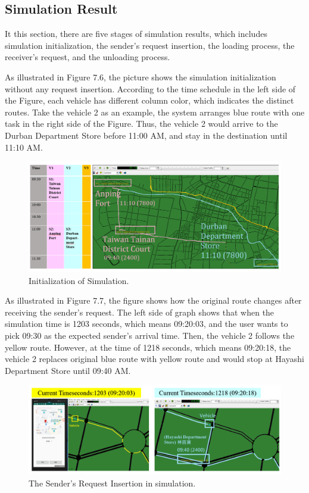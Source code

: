 \documentclass[12pt]{ksthesis}
\begin{document}
\begin{thesis}
{\section{Simulation Result}
It this section, there are five stages of simulation results, which includes simulation initialization, the sender’s request insertion, the loading process, the receiver’s request, and the unloading process.

As illustrated in Figure 7.6, the picture shows the simulation initialization without any request insertion. According to the time schedule in the left side of the Figure, each vehicle has different column color, which indicates the distinct routes. Take the vehicle 2 as an example, the system arranges blue route with one task in the right side of the Figure. Thus, the vehicle 2 would arrive to the Durban Department Store before 11:00 AM, and stay in the destination until 11:10 AM.

\begin{figure}[H]
\centering
\includegraphics[width=1.12\textwidth]{./Thesis_figures/F7-6_initialization.PNG}
\caption{\large Initialization of Simulation.}
\vspace{0.5cm}
\label{Fig:Initialization_of_Simulation}
\end{figure}

As illustrated in Figure 7.7, the figure shows how the original route changes after receiving the sender’s request.
The left side of graph shows that when the simulation time is 1203 seconds, which means 09:20:03, and the user wants to pick 09:30 as the expected sender’s arrival time. Then, the vehicle 2 follows the yellow route. However, at the time of 1218 seconds, which means 09:20:18, the vehicle 2 replaces original blue route with yellow route and would stop at Hayashi Department Store until 09:40 AM.

\begin{figure}[H]
\centering
\includegraphics[width=1.12\textwidth]{./Thesis_figures/F7-7_senderRequest.PNG}
\caption{\large The Sender’s Request Insertion in simulation.}
\vspace{0.5cm}
\label{Fig:sender_request}
\end{figure}


}
\end{thesis}
\end{document}

